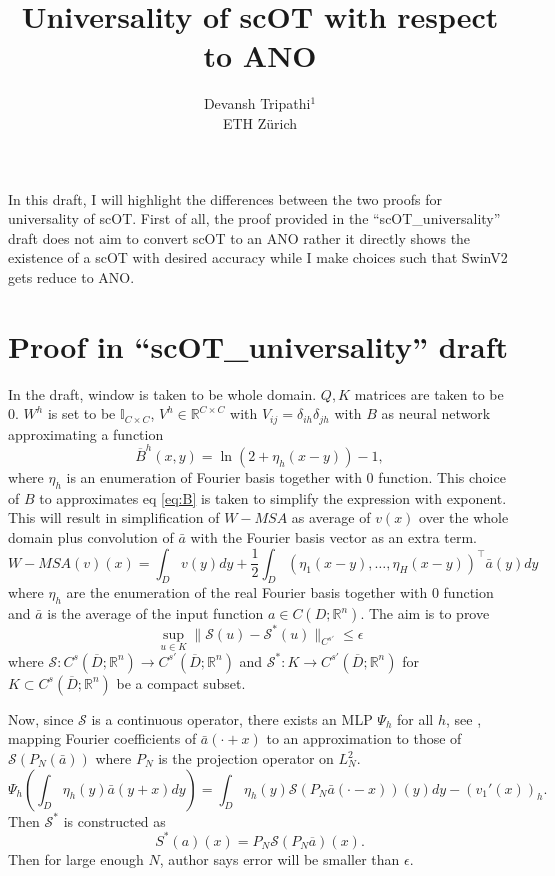 \documentclass[reqno,10pt]{amsart}
\title{Universality of scOT with respect to ANO}
\author{Devansh Tripathi$^1$ \\ ETH Z\lowercase{\"urich}}
\theoremstyle{plain}
\theoremstyle{definition}
\newcommand{\bb}[1]{\mathbb{#1}}
\newcommand{\cal}[1]{\mathcal{#1}}
\begin{document}

\maketitle
In this draft, I will highlight the differences between the two proofs for universality of scOT. First of all, the proof provided in the ``scOT\_universality'' draft does not aim to convert scOT to an ANO rather it directly shows the existence of a scOT with desired accuracy while I make choices such that SwinV2 gets reduce to ANO.

\section{Proof in ``scOT\_universality'' draft}

In the draft, window is taken to be whole domain. $Q, K$ matrices are taken to be $0$. $W^h$ is set to be $\bb I_{C\times C}$, $V^h \in \bb R^{C\times C}$ with $V_{ij} = \delta_{ih}\delta_{jh}$ with $B$ as neural network approximating a function
\begin{equation} \label{eq:B}
    \overline{B}^h(x,y) = \ln(2+\eta_h(x-y)) -1,
\end{equation}
where $\eta_h$ is an enumeration of Fourier basis together with $0$ function. This choice of $B$ to approximates eq \ref{eq:B} is taken to simplify the expression with exponent. This will result in simplification of $W-MSA$ as average of $v(x)$ over the whole domain plus convolution of $\bar{a}$ with the Fourier basis vector as an extra term.
$$ W-MSA(v)(x) = \int_D v(y)dy + \frac{1}{2} \int_D(\eta_1(x-y), \dots, \eta_H(x-y))^\top \bar{a}(y) dy$$
where $\eta_h$ are the enumeration of the real Fourier basis together with $0$ function and $\bar{a}$ is the average of the input function $a \in C(D;\bb R^n)$. The aim is to prove
$$ \sup_{u \in K}\|\cal S(u) - \cal S^*(u)\|_{C^{s'}} \leq \epsilon$$
where $\cal S: C^s(\overline{D};\bb R^n) \to C^{s'}(\overline{D};\bb R^n)$ and $\cal S^{*} : K \to C^{s'}(\overline{D};\bb R^n)$ for $K \subset C^s(\overline{D};\bb R^n)$ be a compact subset.

Now, since $\cal S$ is a continuous operator, there exists an MLP $\Psi_h$ for all $h$, see \cite{SL2024}, mapping Fourier coefficients of $\bar{a}(\cdot+x)$ to an approximation to those of $\cal S(P_N(\bar{a}))$ where $P_N$ is the projection operator on $L^2_N$.
$$ \Psi_h\left(\int_D \eta_h (y)\bar{a}(y+x) dy\right) = \int_D \eta_h(y)\cal S(P_N\bar{a}(\cdot-x))(y) dy - (v_1'(x))_h.$$
Then $\cal S^*$ is constructed as 
$$ S^*(a)(x) = P_N\cal S(P_N\overline{a})(x).$$
Then for large enough $N$, author says error will be smaller than $\epsilon$.
\end{document}
